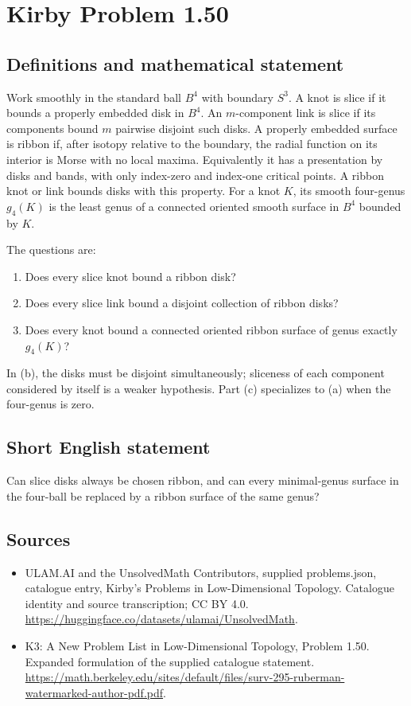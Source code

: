 \documentclass[11pt,a4paper]{article}
\begin{document}
\section*{Kirby Problem 1.50}\label{statement}

\subsection{Definitions and mathematical statement}
Work smoothly in the standard ball $B^4$ with boundary $S^3$.
A knot is slice if it bounds a properly embedded disk in $B^4$. An
$m$-component link is slice if its components bound $m$ pairwise disjoint such
disks. A properly embedded surface is ribbon if, after isotopy relative to the
boundary, the radial function on its interior is Morse with no local maxima.
Equivalently it has a presentation by disks and bands, with only index-zero and
index-one critical points. A ribbon knot or link bounds disks with this property.
For a knot $K$, its smooth four-genus $g_4(K)$ is the least genus of a connected
oriented smooth surface in $B^4$ bounded by $K$.

The questions are:
\begin{enumerate}
\item Does every slice knot bound a ribbon disk?
\item Does every slice link bound a disjoint collection of ribbon disks?
\item Does every knot bound a connected oriented ribbon surface of genus
exactly $g_4(K)$?
\end{enumerate}
In (b), the disks must be disjoint simultaneously; sliceness of each component
considered by itself is a weaker hypothesis. Part (c) specializes to (a) when
the four-genus is zero.
\subsection{Short English statement}
Can slice disks always be chosen ribbon, and can every minimal-genus surface in the four-ball be replaced by a ribbon surface of the same genus?
\subsection{Sources}
\begin{itemize}
\item[S1] ULAM.AI and the UnsolvedMath Contributors, supplied problems.json, catalogue entry, Kirby's Problems in Low-Dimensional Topology. Catalogue identity and source transcription; CC BY 4.0.
\url{https://huggingface.co/datasets/ulamai/UnsolvedMath}.
\item[S2] K3: A New Problem List in Low-Dimensional Topology, Problem 1.50. Expanded formulation of the supplied catalogue statement.
\url{https://math.berkeley.edu/sites/default/files/surv-295-ruberman-watermarked-author-pdf.pdf}.
\end{itemize}
\end{document}
